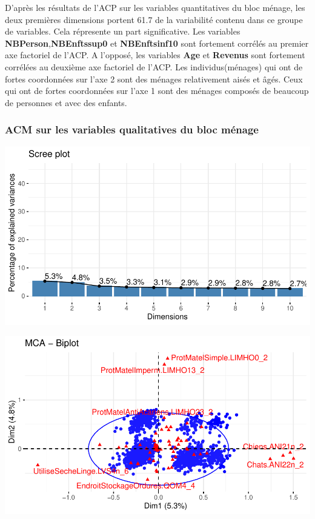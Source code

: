 \documentclass[11pt,a4paper, x11names]{article}\usepackage[]{graphicx}\usepackage[]{color}
\makeatletter
\def\maxwidth{ %
  \ifdim\Gin@nat@width>\linewidth
    \linewidth
  \else
    \Gin@nat@width
  \fi
}
\newenvironment{knitrout}{}{} %
\makeatother
\begin{document}
D'après les résultats de l'ACP sur les variables quantitatives du bloc ménage,
les deux premières dimensions portent 61.7 de la variabilité contenu dans ce groupe de variables. Cela répresente un part significative. Les variables \textbf{NBPerson},\textbf{NBEnftssup0} et \textbf{NBEnftsinf10} sont fortement corrélés au premier axe factoriel de l'ACP. A l'opposé, les variables  \textbf{Age} et \textbf{Revenus} sont fortement corrélées au deuxième axe factoriel de l'ACP. Les individus(ménages) qui ont de fortes coordonnées sur l'axe 2 sont des ménages relativement aisés et âgés. Ceux qui ont de fortes coordonnées sur l'axe 1 sont des ménages composés de beaucoup de personnes et avec des enfants.

\subsubsection{ACM sur les variables qualitatives du bloc ménage}
\begin{minipage}{0.49\linewidth}
\begin{mdframed}
\begin{knitrout}
\color{fgcolor}
\includegraphics[width=\maxwidth]{figure/unnamed-chunk-18-1} 
\end{knitrout}
\end{mdframed}
\end{minipage}
\hfill
\begin{minipage}{0.49\linewidth}
\begin{mdframed}
\begin{knitrout}
\color{fgcolor}
\includegraphics[width=\maxwidth]{figure/unnamed-chunk-19-1} 
\end{knitrout}
\end{mdframed}
\end{minipage}
\end{document}
